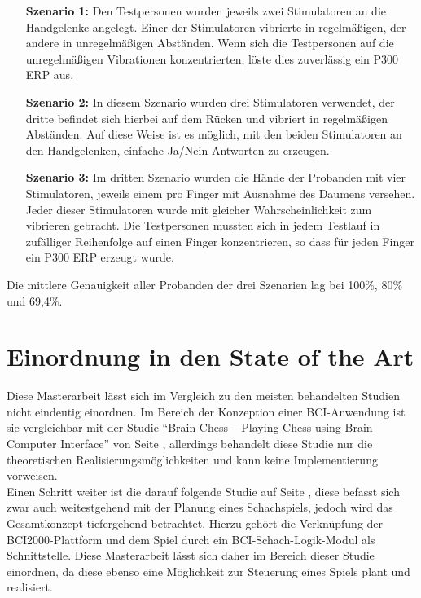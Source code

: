 \begin{itemize}

\item[\textbf{Szenario 1: }] Den Testpersonen wurden jeweils zwei Stimulatoren an die Handgelenke angelegt. 
Einer der Stimulatoren vibrierte in regelmäßigen, der andere in unregelmäßigen Abständen. 
Wenn sich die Testpersonen auf die unregelmäßigen Vibrationen konzentrierten, löste dies zuverlässig ein \acs{P300 ERP} aus.

\item[\textbf{Szenario 2: }] In diesem Szenario wurden drei Stimulatoren verwendet, der dritte befindet sich hierbei auf dem Rücken und vibriert in regelmäßigen Abständen.
Auf diese Weise ist es möglich, mit den beiden Stimulatoren an den Handgelenken, einfache Ja/Nein-Antworten zu erzeugen.

\item[\textbf{Szenario 3: }] Im dritten Szenario wurden die Hände der Probanden mit vier Stimulatoren, jeweils einem pro Finger mit Ausnahme des Daumens versehen.
Jeder dieser Stimulatoren wurde mit gleicher Wahrscheinlichkeit zum vibrieren gebracht.
Die Testpersonen mussten sich in jedem Testlauf in zufälliger Reihenfolge auf einen Finger konzentrieren,
so dass für jeden Finger ein \acs{P300 ERP} erzeugt wurde.\\
\end{itemize}

Die mittlere Genauigkeit aller Probanden der drei Szenarien lag bei 100\%, 80\% und 69,4\%.






\pagebreak
\section{Einordnung in den State of the Art}

Diese Masterarbeit lässt sich im Vergleich zu den meisten behandelten Studien nicht eindeutig einordnen.
Im Bereich der Konzeption einer BCI-Anwendung ist sie vergleichbar mit der Studie "`Brain Chess – Playing Chess using Brain Computer Interface"' von Seite \pageref{chessconcept}, 
allerdings behandelt diese Studie nur die theoretischen Realisierungsmöglichkeiten und kann keine Implementierung vorweisen.\\

Einen Schritt weiter ist die darauf folgende Studie auf Seite \pageref{chessDesignAndImplemention}, diese befasst sich zwar auch weitestgehend mit der Planung eines Schachspiels, 
jedoch wird das Gesamtkonzept tiefergehend betrachtet. 
Hierzu gehört die Verknüpfung der \acs{BCI2000}-Plattform und dem Spiel durch ein BCI-Schach-Logik-Modul als Schnittstelle.
Diese Masterarbeit lässt sich daher im Bereich dieser Studie einordnen, da diese ebenso eine Möglichkeit zur Steuerung eines Spiels plant und realisiert.\\

